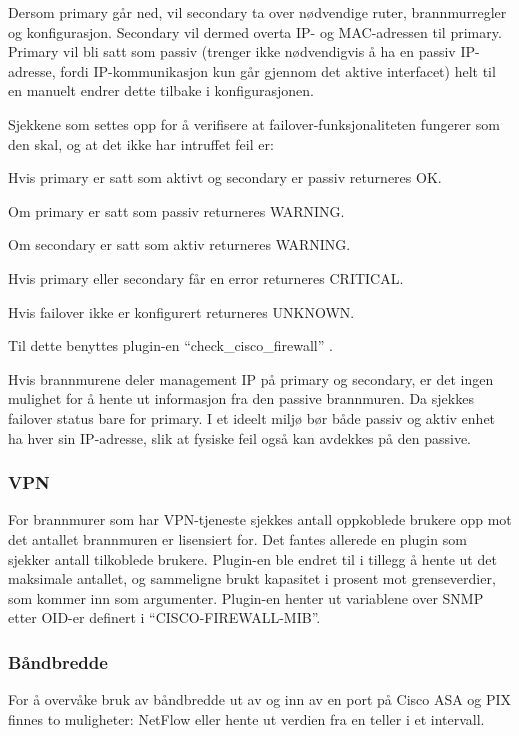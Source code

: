 Dersom primary går ned, vil secondary ta over nødvendige ruter, brannmurregler og konfigurasjon. Secondary vil dermed overta IP- og MAC-adressen til primary. Primary vil bli satt som passiv (trenger ikke nødvendigvis å ha en passiv IP-adresse, fordi IP-kommunikasjon kun går gjennom det aktive interfacet) helt til en manuelt endrer dette tilbake i konfigurasjonen. \cite{ciscofailover} 

Sjekkene som settes opp for å verifisere at failover-funksjonaliteten fungerer som den skal, og at det ikke har intruffet feil er:
\begin{itemize*}
\item Hvis primary er satt som aktivt og secondary er passiv returneres OK.
\item Om primary er satt som passiv returneres WARNING. 
\item Om secondary er satt som aktiv returneres WARNING.
\item Hvis primary eller secondary får en error returneres CRITICAL.
\item Hvis failover ikke er konfigurert returneres UNKNOWN. 
\end{itemize*}

Til dette benyttes plugin-en ``check\_cisco\_firewall'' \cite{checkciscofirewall}.

Hvis brannmurene deler management IP på primary og secondary, er det ingen mulighet for å hente ut informasjon fra den passive brannmuren. Da sjekkes failover status bare for primary. I et ideelt miljø bør både passiv og aktiv enhet ha hver sin IP-adresse, slik at fysiske feil også kan avdekkes på den passive.

\subsubsection{VPN}
For brannmurer som har VPN-tjeneste sjekkes antall oppkoblede brukere opp mot det antallet brannmuren er lisensiert for. Det fantes allerede en plugin som sjekker antall tilkoblede brukere\cite{checkciscovpn}. Plugin-en ble endret til i tillegg å hente ut det maksimale antallet, og sammeligne brukt kapasitet i prosent mot grenseverdier, som kommer inn som argumenter. Plugin-en henter ut variablene over SNMP etter OID-er definert i ``CISCO-FIREWALL-MIB''\cite{cisco_fw_mib}.

\subsubsection{Båndbredde}
For å overvåke bruk av båndbredde ut av og inn av en port på Cisco ASA og PIX finnes to muligheter: NetFlow eller hente ut verdien fra en teller i et intervall.

